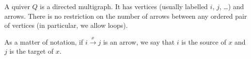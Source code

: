 A quiver $Q$ is a directed multigraph. It has vertices (usually labelled
$i$, $j$, \ldots) and arrows. There is no restriction on the number of arrows
between any ordered pair of vertices (in particular, we allow loops).

As a matter of notation, if $i\stackrel{x}{\longrightarrow} j$ is an arrow,
we say that  $i$ is the source of $x$ and $j$ is the target of $x$.
